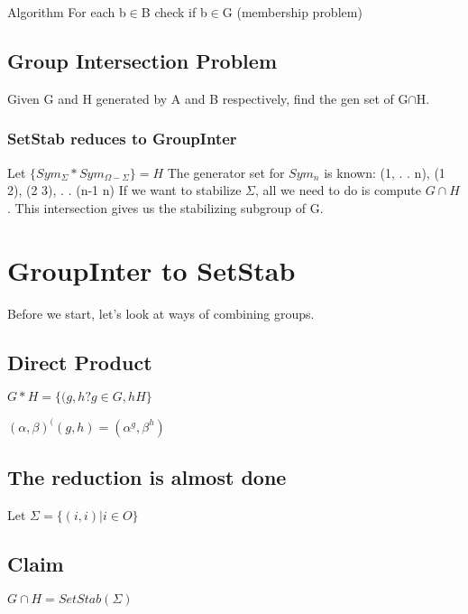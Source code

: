 Algorithm
For each b$\in$B check if b$\in$G (membership problem)

\subsection{Group Intersection Problem}
Given G and H generated by A and B respectively, find the gen set of G$\cap$H.


\subsubsection{SetStab reduces to GroupInter}
Let $\{Sym_{\Sigma} * Sym_{\Omega - \Sigma}\} = H$\newline
The generator set for $Sym_n$ is known: (1, . . n), (1 2), (2 3), . . (n-1 n)\newline
If we want to stabilize $\Sigma$, all we need to do is compute $G \cap H$\newline. This intersection gives us the stabilizing subgroup of G.




\section{GroupInter to SetStab}
Before we start, let's look at ways of combining groups.

\subsection{Direct Product}
$G*H=\{(g,h?g \in G,hH\}$

$(\alpha,\beta)^((g,h )=(\alpha^g,\beta^h)$

\subsection{The reduction is almost done}
Let $\Sigma=\{ (i,i)| i \in O\}$

\subsection{Claim}
$G \cap H=SetStab(\Sigma)$

